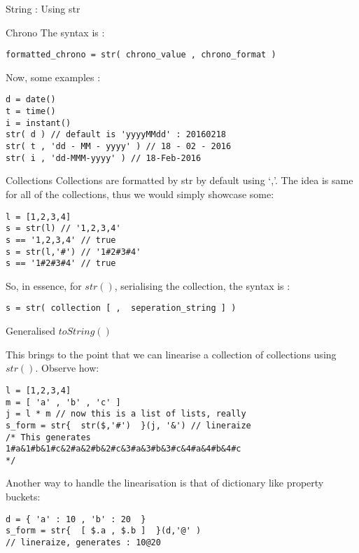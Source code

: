 \begin{section}{String : Using str}
\begin{subsection}{Chrono}
The syntax is :

\begin{lstlisting}[style=JexlStyle]
formatted_chrono = str( chrono_value , chrono_format )
\end{lstlisting}

Now, some examples :

\begin{lstlisting}[style=JexlStyle]
d = date()
t = time()
i = instant()
str( d ) // default is 'yyyyMMdd' : 20160218
str( t , 'dd - MM - yyyy' ) // 18 - 02 - 2016
str( i , 'dd-MMM-yyyy' ) // 18-Feb-2016 
\end{lstlisting}

\end{subsection}

\begin{subsection}{Collections}
Collections are formatted by str by default using `,'.
The idea is same for all of the collections, thus we would simply showcase some:

\begin{lstlisting}[style=JexlStyle]
l = [1,2,3,4]
s = str(l) // '1,2,3,4'
s == '1,2,3,4' // true 
s = str(l,'#') // '1#2#3#4'
s == '1#2#3#4' // true 
\end{lstlisting}

So, in essence, for $str()$, serialising the collection, the syntax is :

\begin{lstlisting}[style=JexlStyle]
s = str( collection [ ,  seperation_string ] )
\end{lstlisting}

\end{subsection}

\begin{subsection}{Generalised $toString()$ }

This brings to the point that we can linearise a collection of collections using $str()$.
Observe how:

\begin{lstlisting}[style=JexlStyle]
l = [1,2,3,4]
m = [ 'a' , 'b' , 'c' ] 
j = l * m // now this is a list of lists, really 
s_form = str{  str($,'#')  }(j, '&') // lineraize 
/* This generates 
1#a&1#b&1#c&2#a&2#b&2#c&3#a&3#b&3#c&4#a&4#b&4#c
*/
\end{lstlisting}

Another way to handle the linearisation is that of dictionary like property buckets:

\begin{lstlisting}[style=JexlStyle]
d = { 'a' : 10 , 'b' : 20  } 
s_form = str{  [ $.a , $.b ]  }(d,'@' ) 
// lineraize, generates : 10@20
\end{lstlisting}
\end{subsection}
\end{section}

